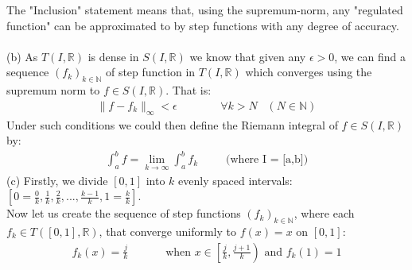 \documentclass[12pt,a4paper]{article}
\begin{document}
The "Inclusion" statement means that, using the supremum-norm, any "regulated function" can be approximated to by step functions with any degree
of accuracy.\\
\\
(b) As $T(I, \mathbb{R})$ is dense in $S(I, \mathbb{R})$ we know that given any $\epsilon > 0$, we can find a sequence $(f_k)_{k \in \mathbb{N}}$ of
step function in $T(I, \mathbb{R})$ which converges using the supremum norm to $f \in S(I, \mathbb{R})$.  That is:
\begin{align*}
 \|f-f_k\|_{\infty}<\epsilon \;\;\;\;\;\;\;\;\;\;\;\;\;\; \forall k > N \;\;\; (N \in \mathbb{N})
\end{align*}
Under such conditions we could then define the Riemann integral of $f \in S(I, \mathbb{R})$ by:
\begin{align*}
\int_a^b f = \lim_{k \to \infty} \int_a^b f_k \;\;\;\;\;\;\;\;\; \text{(where I = [a,b])}
\end{align*}
\newpage
\noindent
(c) Firstly, we divide $[0,1]$ into $k$ evenly spaced intervals: $[0 = \frac{0}{k}, \frac{1}{k}, \frac{2}{k}, ..., \frac{k-1}{k}, 1=\frac{k}{k}]$. \\
Now let us create the sequence of step functions $(f_k)_{k \in \mathbb{N}}$, where each $f_k \in T([0, 1], \mathbb{R})$, that converge uniformly 
to $f(x)=x$ on $[0,1]$:
\begin{align*}
 f_k(x) = \frac{j}{k} \;\;\;\;\;\;\;\;\;\;\;\; \text{when $x \in \left[\frac{j}{k}, \frac{j+1}{k}\right)$ and $f_k(1)=1$}
\end{align*}

\newpage
\end{document}
